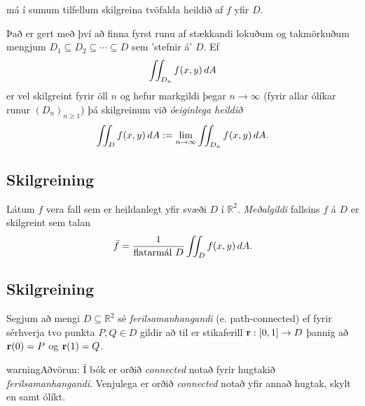 \documentclass[a4paper,10pt,icelandic]{sphinxmanual}
\begin{document}
má í sumum tilfellum skilgreina tvöfalda heildið af \(f\) yfir
\(D\).

Það er gert með því að finna fyrst runu af stækkandi lokuðum og
takmörkuðum mengjum
\(D_1 \subseteq D_2 \subseteq \cdots \subseteq D\) sem ’stefnir á’
\(D\). Ef
\begin{gather}
\begin{split}\displaystyle \int\!\!\!\int_{D_n} f(x,y)\,dA\end{split}\notag
\end{gather}
er vel skilgreint fyrir öll \(n\) og hefur markgildi þegar
\(n\to \infty\) (fyrir allar ólíkar runur \((D_n)_{n\geq 1}\))
þá skilgreinum við \emph{óeiginlega heildið}
\begin{gather}
\begin{split}\displaystyle \int\!\!\!\int_{D} f(x,y)\,dA := \lim_{n\to \infty} \int\!\!\!\int_{D_n} f(x,y)\,dA .\end{split}\notag
\end{gather}

\subsection{Skilgreining}
\label{Kafli4:id8}
Látum \(f\) vera fall sem er heildanlegt yfir svæði \(D\) í
\({\mathbb  R}^2\). \emph{Meðalgildi} fallsins \(f\) á \(D\) er
skilgreint sem talan
\begin{gather}
\begin{split}\displaystyle \bar{f}=\frac{1}{\mbox{flatarmál }D}\int\!\!\!\int_D f(x,y)\,dA.\end{split}\notag
\end{gather}

\subsection{Skilgreining}
\label{Kafli4:id9}
Segjum að mengi \(D\subseteq {\mathbb  R}^2\) sé
\emph{ferilsamanhangandi} (e. path-connected) ef fyrir sérhverja
tvo punkta \(P, Q\in D\) gildir að til er stikaferill
\(\mbox{${\bf r}$}:[0,1]\rightarrow D\) þannig að
\(\mbox{${\bf r}$}(0)=P\) og \(\mbox{${\bf r}$}(1)=Q\).

\begin{notice}{warning}{Aðvörun:}
Í bók er orðið \emph{connected} notað fyrir hugtakið \emph{ferilsamanhangandi}. Venjulega er orðið \emph{connected} notað yfir annað hugtak, skylt en samt ólíkt.
\end{notice}
\end{document}
